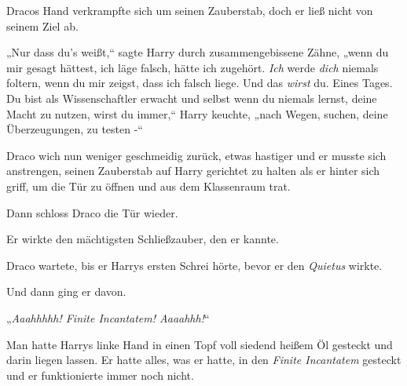 Dracos Hand verkrampfte sich um seinen Zauberstab, doch er ließ nicht von seinem Ziel ab.

„Nur dass du's weißt,“ sagte Harry durch zusammengebissene Zähne, „wenn du mir gesagt hättest, ich läge falsch, hätte ich zugehört. \emph{Ich} werde \emph{dich} niemals foltern, wenn du mir zeigst, dass ich falsch liege. Und das \emph{wirst} du. Eines Tages. Du bist als Wissenschaftler erwacht und selbst wenn du niemals lernst, deine Macht zu nutzen, wirst du immer,“ Harry keuchte, „nach Wegen, suchen, deine Überzeugungen, zu testen -“

Draco wich nun weniger geschmeidig zurück, etwas hastiger und er musste sich anstrengen, seinen Zauberstab auf Harry gerichtet zu halten als er hinter sich griff, um die Tür zu öffnen und aus dem Klassenraum trat.

Dann schloss Draco die Tür wieder.

Er wirkte den mächtigsten Schließzauber, den er kannte.

Draco wartete, bis er Harrys ersten Schrei hörte, bevor er den \emph{Quietus} wirkte.

Und dann ging er davon.

\later

„\emph{Aaahhhhh! Finite Incantatem! Aaaahhh!}“

Man hatte Harrys linke Hand in einen Topf voll siedend heißem Öl gesteckt und darin liegen lassen. Er hatte alles, was er hatte, in den \emph{Finite Incantatem} gesteckt und er funktionierte immer noch nicht.

